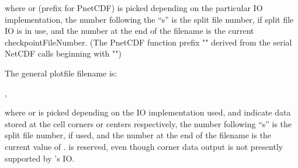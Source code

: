 \noindent
where  or  (prefix for PnetCDF) is picked
depending on the particular IO implementation, the number following the ``s'' is 
the split file number, if split file IO is in use, 
and the number at the end of the
filename is the current checkpointFileNumber.  (The PnetCDF function
prefix "" derived from the serial NetCDF calls beginning with
"")

The general plotfile filename is:
\medskip

\enskip,
\medskip



\noindent
where  or  is picked depending on the IO
implementation used,
 and  indicate data stored at the
cell corners or centers respectively, the number following ``s'' is the split file 
number, if used, and the number at the end of the
filename is the current value of .   is reserved, even though 
corner data output is not presently supported by \flashx's IO.

\begin{comment}
Similarly, the general particle filename is:
\medskip

\texttt{
basename\_$\left\{\begin{array}{c}\mathtt{hdf5}\\ \mathtt{ncmpi}\\
             \end{array}\right\}$\_part\_0000}\enskip,
\medskip

\noindent
where \code{hdf5} or \code{ncmpi} is picked depending on the IO
implementation
used, and the number at the end of the filename is the current value in 
\code{particleFileNumber}.
\end{comment}


